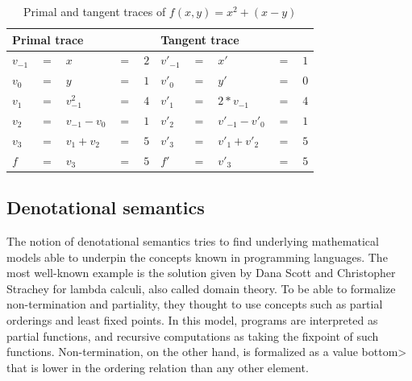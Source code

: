 \documentclass[11pt, final]{article}
\begin{document}
\begin{table}
  \begin{center}
    \begin{tabular}{ l l l l l | l l l l l }
      \hline
      \multicolumn{5}{l}{Primal trace} & \multicolumn{5}{l}{Tangent trace} \\
      \hline
$v_{-1} $&$=$&$x$&$=$&$2$             &$v'_{-1}$&$=$&$x'$&$=$&$1$ \\
$v_0    $&$=$&$y$&$=$&$1$             &$v'_{0}$&$=$&$y'$&$=$&$0$ \\
      \hline
$v_1    $&$=$&$v_{-1}^2$&$=$&$4$      &$v'_{1}$&$=$&$2*v_{-1}$&$=$&$4$ \\
$v_2    $&$=$&$v_{-1} - v_{0}$&$=$&$1$&$v'_{2}$&$=$&$v'_{-1}-v'_{0}$&$=$&$1$ \\
$v_3    $&$=$&$v_1 + v_2$&$=$&$5$     &$v'_{3}$&$=$&$v'_1 + v'_2$&$=$&$5$ \\
      \hline
$f      $&$=$&$v_3$&$=$&$5$           &$f'$&$=$&$v'_3$&$=$&$5$ \\
      \hline
    \end{tabular}
  \end{center}
  \caption{Primal and tangent traces of $f(x, y) = x^2 + (x - y)$}
  \label{table:func_trace}
\end{table}

\subsection{Denotational semantics}

The notion of denotational semantics tries to find underlying mathematical models able to underpin the concepts known in programming languages. The most well-known example is the solution given by Dana Scott and Christopher Strachey\cite{Scott1977} for lambda calculi, also called domain theory.
To be able to formalize non-termination and partiality, they thought to use concepts such as partial orderings and least fixed points\cite{aaby2020}.
In this model, programs are interpreted as partial functions, and recursive computations as taking the fixpoint of such functions.
Non-termination, on the other hand, is formalized as a value \<bottom> that is lower in the ordering relation than any other element.
\end{document}
